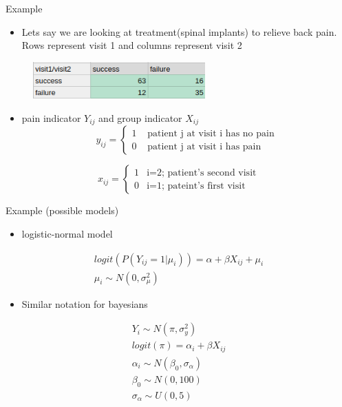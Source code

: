 \documentclass[ignorenonframetext,]{beamer}
\providecommand{\tightlist}{%
  \setlength{\itemsep}{0pt}\setlength{\parskip}{0pt}}
\begin{document}
\begin{frame}{Example}

\begin{itemize}
\tightlist
\item
  Lets say we are looking at treatment(spinal implants) to relieve back
  pain. Rows represent visit 1 and columns represent visit 2
\end{itemize}

\begin{figure}
\centering
\includegraphics[width=2.60417in]{img6.png}
\caption{}
\end{figure}

\begin{itemize}
\tightlist
\item
  pain indicator \(Y_{ij}\) and group indicator \(X_{ij}\)
  \[y_{ij} = \begin{cases}
  1 & \text{ patient j at visit i has no pain} \\
  0 & \text{ patient j at visit i has pain}
   \end{cases}\]
\end{itemize}

\[x_{ij} = \begin{cases}
    1 & \text{i=2; patient's second visit} \\
    0 & \text{i=1; pateint's first visit}
 \end{cases}\]

\end{frame}

\begin{frame}{Example (possible models)}

\begin{itemize}
\tightlist
\item
  logistic-normal model
\end{itemize}

\[
\begin{aligned}
logit(P(Y_{ij}=1|\mu_i)) = \alpha + \beta X_{ij} + \mu_i \\
\mu_i \sim N(0, \sigma^2_{\mu})
\end{aligned}
\]

\begin{itemize}
\tightlist
\item
  Similar notation for bayesians
\end{itemize}

\[
\begin{aligned}
Y_i \sim N(\pi, \sigma^2_y) \\
logit(\pi) = \alpha_i + \beta X_{ij}\\
\alpha_i \sim N(\beta_0, \sigma_\alpha) \\
\beta_0 \sim N(0,100)\\
\sigma_\alpha \sim U(0,5)
\end{aligned}
\]

\end{frame}
\end{document}
